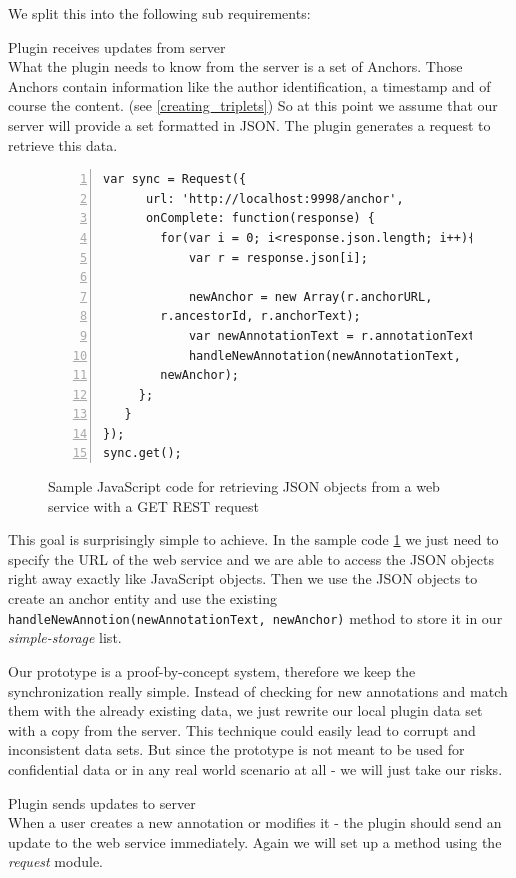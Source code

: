 We split this into the following sub requirements:
\begin{description}
\item Plugin receives updates from server\\
What the plugin needs to know from the server is a set of Anchors. Those Anchors contain information like the author identification, a timestamp and of course the content.
(see \ref{creating_triplets}) 
So at this point we assume that our server will provide a set formatted in JSON. The plugin generates a request to retrieve this data. 
\begin{figure}
\begin{lstlisting}[numbers=left]
var sync = Request({
      url: 'http://localhost:9998/anchor',
      onComplete: function(response) {
        for(var i = 0; i<response.json.length; i++){
            var r = response.json[i];

            newAnchor = new Array(r.anchorURL, 
		r.ancestorId, r.anchorText);
            var newAnnotationText = r.annotationText;
            handleNewAnnotation(newAnnotationText, 
		newAnchor);
     };
   }
});
sync.get();
\end{lstlisting}
\label{anchor_sample_code}
\caption{Sample JavaScript code for retrieving JSON objects from a web service with a GET REST request}
\end{figure}

This goal is surprisingly simple to achieve. In the sample code \ref{anchor_sample_code} we just need to specify the URL of the web service and we are able to access the JSON objects right away exactly like JavaScript objects. Then we use the JSON objects to create an anchor entity and use the existing \verb| handleNewAnnotion(newAnnotationText, newAnchor)| method to store it in our \emph{simple-storage} list. 

Our prototype is a proof-by-concept system, therefore we keep the synchronization really simple. Instead of checking for new annotations and match them with the already existing data, we just rewrite our local plugin data set with a copy from the server. This technique could easily lead to corrupt and inconsistent data sets. But since the prototype is not meant to be used for confidential data or in any real world scenario at all - we will just take our risks.

\item Plugin sends updates to server\\
When a user creates a new annotation or modifies it - the plugin should send an update to the web service immediately. Again we will set up a method using the \emph{request} module. 
\end{description}

